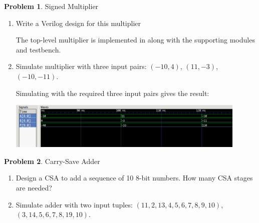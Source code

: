 \documentclass[10pt]{article}
\theoremstyle{definition}
\newtheorem{problem}{Problem}
\begin{document}
  \newpage

  \begin{problem}
    Signed Multiplier

    \begin{enumerate}
      \item Write a Verilog design for this multiplier

            The top-level multiplier is implemented in \texttt{} along with the supporting modules and testbench.

      \item Simulate multiplier with three input pairs: $(-10, 4)$, $(11, -3)$, $(-10, -11)$.

      Simulating with the required three input pairs gives the result:

      \includegraphics*[width=0.9\textwidth] {multiplier_signed_5-screenshot.png}

    \end{enumerate}
  \end{problem}

  \newpage

  \begin{problem}
    Carry-Save Adder

    \begin{enumerate}
      \item Design a CSA to add a sequence of 10 8-bit numbers. How many CSA stages are needed?
      \item Simulate adder with two input tuples: $(11, 2, 13, 4, 5, 6, 7, 8, 9, 10)$, $(3, 14, 5, 6, 7, 8, 19, 10)$.
    \end{enumerate}
  \end{problem}

  \newpage
\end{document}
